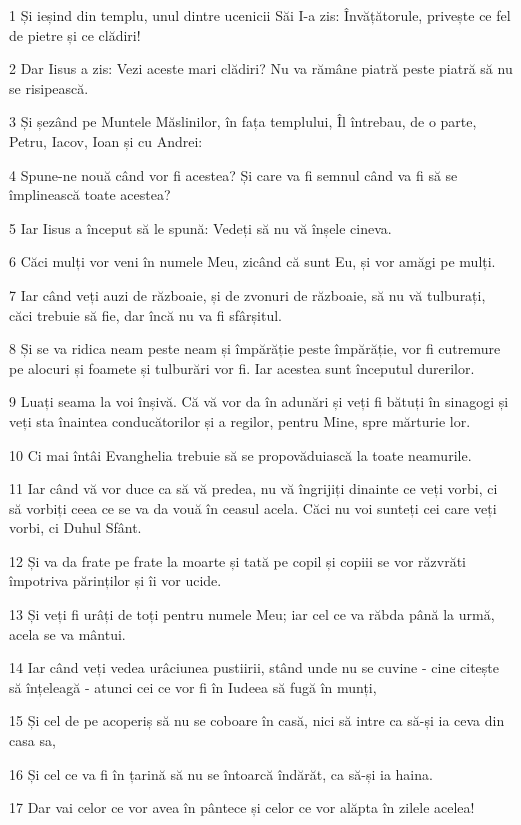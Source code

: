 \par 1 Și ieșind din templu, unul dintre ucenicii Săi I-a zis: Învățătorule, privește ce fel de pietre și ce clădiri!
\par 2 Dar Iisus a zis: Vezi aceste mari clădiri? Nu va rămâne piatră peste piatră să nu se risipească.
\par 3 Și șezând pe Muntele Măslinilor, în fața templului, Îl întrebau, de o parte, Petru, Iacov, Ioan și cu Andrei:
\par 4 Spune-ne nouă când vor fi acestea? Și care va fi semnul când va fi să se împlinească toate acestea?
\par 5 Iar Iisus a început să le spună: Vedeți să nu vă înșele cineva.
\par 6 Căci mulți vor veni în numele Meu, zicând că sunt Eu, și vor amăgi pe mulți.
\par 7 Iar când veți auzi de războaie, și de zvonuri de războaie, să nu vă tulburați, căci trebuie să fie, dar încă nu va fi sfârșitul.
\par 8 Și se va ridica neam peste neam și împărăție peste împărăție, vor fi cutremure pe alocuri și foamete și tulburări vor fi. Iar acestea sunt începutul durerilor.
\par 9 Luați seama la voi înșivă. Că vă vor da în adunări și veți fi bătuți în sinagogi și veți sta înaintea conducătorilor și a regilor, pentru Mine, spre mărturie lor.
\par 10 Ci mai întâi Evanghelia trebuie să se propovăduiască la toate neamurile.
\par 11 Iar când vă vor duce ca să vă predea, nu vă îngrijiți dinainte ce veți vorbi, ci să vorbiți ceea ce se va da vouă în ceasul acela. Căci nu voi sunteți cei care veți vorbi, ci Duhul Sfânt.
\par 12 Și va da frate pe frate la moarte și tată pe copil și copiii se vor răzvrăti împotriva părinților și îi vor ucide.
\par 13 Și veți fi urâți de toți pentru numele Meu; iar cel ce va răbda până la urmă, acela se va mântui.
\par 14 Iar când veți vedea urâciunea pustiirii, stând unde nu se cuvine - cine citește să înțeleagă - atunci cei ce vor fi în Iudeea să fugă în munți,
\par 15 Și cel de pe acoperiș să nu se coboare în casă, nici să intre ca să-și ia ceva din casa sa,
\par 16 Și cel ce va fi în țarină să nu se întoarcă îndărăt, ca să-și ia haina.
\par 17 Dar vai celor ce vor avea în pântece și celor ce vor alăpta în zilele acelea!
